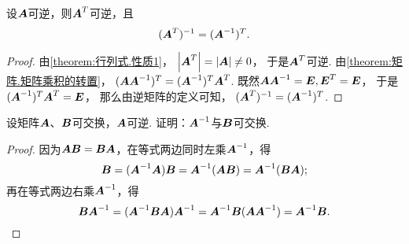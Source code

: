 \begin{property}\label{theorem:逆矩阵.转置矩阵的逆与逆矩阵的转置}
设\(\boldsymbol{A}\)可逆，则\(\boldsymbol{A}^T\)可逆，且\begin{equation}
	(\boldsymbol{A}^T)^{-1} = (\boldsymbol{A}^{-1})^T.
\end{equation}
\begin{proof}
由\cref{theorem:行列式.性质1}，
\(\abs{\boldsymbol{A}^T}=\abs{\boldsymbol{A}}\neq0\)，
于是\(\boldsymbol{A}^T\)可逆.
由\cref{theorem:矩阵.矩阵乘积的转置}，
\((\boldsymbol{A} \boldsymbol{A}^{-1})^T = (\boldsymbol{A}^{-1})^T \boldsymbol{A}^T\).
既然\(\boldsymbol{A} \boldsymbol{A}^{-1} = \boldsymbol{E}, \boldsymbol{E}^T = \boldsymbol{E}\)，
于是\((\boldsymbol{A}^{-1})^T \boldsymbol{A}^T = \boldsymbol{E}\)，
那么由逆矩阵的定义可知，
\((\boldsymbol{A}^T)^{-1}=(\boldsymbol{A}^{-1})^T\).
\end{proof}
\end{property}

\begin{example}
设矩阵\(\boldsymbol{A}\)、\(\boldsymbol{B}\)可交换，\(\boldsymbol{A}\)可逆.
证明：\(\boldsymbol{A}^{-1}\)与\(\boldsymbol{B}\)可交换.
\begin{proof}
因为\(\boldsymbol{A}\boldsymbol{B} = \boldsymbol{B}\boldsymbol{A}\)，在等式两边同时左乘\(\boldsymbol{A}^{-1}\)，得\[
	\boldsymbol{B} = (\boldsymbol{A}^{-1}\boldsymbol{A})\boldsymbol{B} = \boldsymbol{A}^{-1}(\boldsymbol{A}\boldsymbol{B}) = \boldsymbol{A}^{-1}(\boldsymbol{B}\boldsymbol{A});
\]
再在等式两边右乘\(\boldsymbol{A}^{-1}\)，得\[
	\boldsymbol{B}\boldsymbol{A}^{-1} = (\boldsymbol{A}^{-1}\boldsymbol{B}\boldsymbol{A})\boldsymbol{A}^{-1} = \boldsymbol{A}^{-1}\boldsymbol{B}(\boldsymbol{A}\boldsymbol{A}^{-1}) = \boldsymbol{A}^{-1}\boldsymbol{B}.
	\qedhere
\]
\end{proof}
\end{example}


